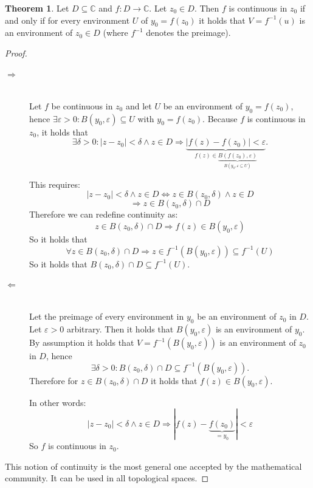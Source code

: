\documentclass[a4paper,landscape,twocolumn]{article}
\theoremstyle{definition}
\newtheorem{theorem}{Theorem}
\newcommand\abs[1]{\left|#1\right|}
\begin{document}
\begin{theorem}
  Let $D \subseteq \mathbb C$ and $f: D \rightarrow \mathbb C$.
  Let $z_0 \in D$. Then $f$ is continuous in $z_0$
  if and only if for every environment $U$ of $y_0 = f(z_0)$
  it holds that $V = f^{-1}(u)$ is an environment of $z_0 \in D$
  (where $f^{-1}$ denotes the preimage).
\end{theorem}

\begin{proof}
  \begin{description}
    \item[$\Rightarrow$] \hfill{} \\
      Let $f$ be continuous in $z_0$ and let $U$ be an environment
      of $y_0 = f(z_0)$, hence $\exists \varepsilon > 0: B(y_0, \varepsilon)
      \subseteq U$ with $y_0 = f(z_0)$. Because $f$ is continuous in $z_0$,
      it holds that
      \[
        \exists \delta > 0:
        \abs{z - z_0} < \delta \land z \in D \Rightarrow
        \underbrace{\abs{f(z) - f(z_0)} < \varepsilon}_{f(z) \in \underbrace{B(f(z_0), \varepsilon)}_{B(y_0, \varepsilon \subseteq U)}}.
      \]

      This requires:
      \[
        \abs{z - z_0} < \delta \land z \in D \Leftrightarrow z \in B(z_0, \delta) \land z \in D
      \]
      \[ \Rightarrow z \in B(z_0, \delta) \cap D \]
      Therefore we can redefine continuity as:
      \[ z \in B(z_0, \delta) \cap D \Rightarrow f(z) \in B(y_0, \varepsilon) \]
      So it holds that
      \[ \forall z \in B(z_0, \delta) \cap D \Rightarrow z \in f^{-1}(B(y_0, \varepsilon)) \subseteq f^{-1}(U) \]
      So it holds that $B(z_0, \delta) \cap D \subseteq f^{-1}(U)$.

    \item[$\Leftarrow$] \hfill{} \\
      Let the preimage of every environment in $y_0$ be an environment of $z_0$ in $D$.
      Let $\varepsilon > 0$ arbitrary. Then it holds that $B(y_0, \varepsilon)$ is an environment of $y_0$.
      By assumption it holds that $V = f^{-1}(B(y_0, \varepsilon))$ is an environment of $z_0$ in $D$,
      hence
      \[ \exists \delta > 0: B(z_0, \delta) \cap D \subseteq f^{-1}(B(y_0, \varepsilon)). \]
      Therefore for $z \in B(z_0, \delta) \cap D$ it holds that $f(z) \in B(y_0, \varepsilon)$.

      In other words:
      \[ \abs{z - z_0} < \delta \land z \in D \Rightarrow |f(z) - \underbrace{f(z_0)}_{= y_0}| < \varepsilon \]
      So $f$ is continuous in $z_0$.
  \end{description}
  This notion of continuity is the most general one accepted by the mathematical community.
  It can be used in all topological spaces.
\end{proof}
\end{document}
